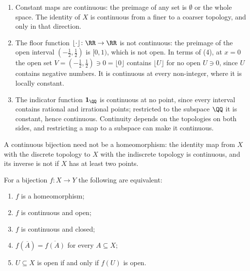 \begin{example}\label{general-topology:example-continuity}
\begin{enumerate}
\item Constant maps are continuous: the preimage of any set is $\emptyset$ or the whole space. The identity of $X$ is continuous from a finer to a coarser topology, and only in that direction.
\item The floor function $\lfloor\cdot\rfloor \colon \RR \to \RR$ is not continuous: the preimage of the open interval $(-\frac12, \frac12)$ is $[0, 1)$, which is not open. In terms of (4), at $x = 0$ the open
set $V = (-\frac12, \frac12) \ni 0 = \lfloor0\rfloor$ contains $\lfloor U\rfloor$ for no open $U \ni 0$, since $U$ contains negative numbers. It is continuous at every non-integer, where it is locally
constant.
\item The indicator function $\mathbf{1}_\QQ$ is continuous at no point, since every interval contains rational and irrational points; restricted to the subspace $\QQ$ it is constant, hence continuous.
Continuity depends on the topologies on both sides, and restricting a map to a subspace can make it continuous.
\end{enumerate}
\end{example}

\begin{counterexample}\label{general-topology:counterexample-bijection-not-homeomorphism}
A continuous bijection need not be a homeomorphism: the identity map from $X$ with the discrete topology to $X$ with the
indiscrete topology is continuous, and its inverse is not if $X$ has at least two points.
\end{counterexample}

\begin{proposition}\label{general-topology:proposition-homeomorphism}
For a bijection $f \colon X \to Y$ the following are equivalent:
\begin{enumerate}
\item $f$ is a homeomorphism;
\item $f$ is continuous and open;
\item $f$ is continuous and closed;
\item $f(\overline{A}) = \overline{f(A)}$ for every $A \subseteq X$;
\item $U \subseteq X$ is open if and only if $f(U)$ is open.
\end{enumerate}
\end{proposition}

